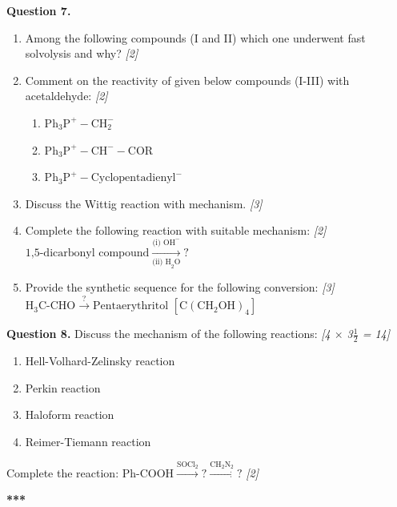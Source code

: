 \documentclass[11pt,a4paper]{article}
\newcommand{\pts}[1]{\hfill \textit{[#1]}}
\begin{document}
\bigskip

\noindent \textbf{Question 7.}
\begin{enumerate}[label=(\alph*)]
  \item Among the following compounds (I and II) which one underwent fast solvolysis and why? \pts{2}
  \item Comment on the reactivity of given below compounds (I-III) with acetaldehyde: \pts{2}
  \begin{enumerate}[label=(\roman*)]
    \item $\text{Ph}_3\text{P}^+-\text{CH}_2^-$
    \item $\text{Ph}_3\text{P}^+-\text{CH}^--\text{COR}$
    \item $\text{Ph}_3\text{P}^+-\text{Cyclopentadienyl}^-$
  \end{enumerate}
  \item Discuss the Wittig reaction with mechanism. \pts{3}
  \item Complete the following reaction with suitable mechanism: \pts{2}\\
  $\text{1,5-dicarbonyl compound} \xrightarrow[\text{(ii) H}_2\text{O}]{\text{(i) OH}^-} ?$
  \item Provide the synthetic sequence for the following conversion: \pts{3}\\
  $\text{H}_3\text{C-CHO} \xrightarrow{?} \text{Pentaerythritol } \left[\text{C}(\text{CH}_2\text{OH})_4\right]$
\end{enumerate}

\bigskip

\noindent \textbf{Question 8.} Discuss the mechanism of the following reactions: \pts{4 $\times$ 3$\frac{1}{2}$ = 14}
\begin{enumerate}[label=(\alph*)]
  \item Hell-Volhard-Zelinsky reaction
  \item Perkin reaction
  \item Haloform reaction
  \item Reimer-Tiemann reaction
\end{enumerate}
Complete the reaction: $\text{Ph-COOH} \xrightarrow{\text{SOCl}_2} ? \xrightarrow{\text{CH}_2\text{N}_2} ?$ \pts{2}

\bigskip
\begin{center}
  \textbf{***}
\end{center}
\end{document}
